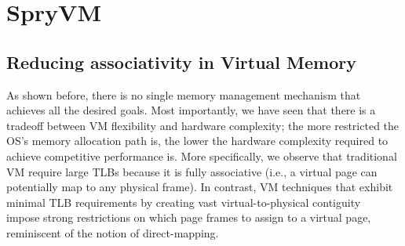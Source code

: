 


\section{SpryVM}
\label{sec:associativity}

%



\subsection{Reducing associativity in Virtual Memory}

As shown before, there is no single memory management mechanism that achieves all the desired goals. Most importantly, we have seen that there is a tradeoff between VM flexibility and hardware complexity; the more restricted the OS's memory allocation path is, the lower the hardware complexity required to achieve competitive performance is. More specifically, we observe that traditional VM require large TLBs because it is fully associative (i.e., a virtual page can potentially map to any physical frame). In contrast, VM techniques that exhibit minimal TLB requirements by creating vast virtual-to-physical contiguity~\cite{basu:efficient, gandhi:range, haria:devirtualizing} impose strong restrictions on which page frames to assign to a virtual page, reminiscent of the notion of direct-mapping. 

